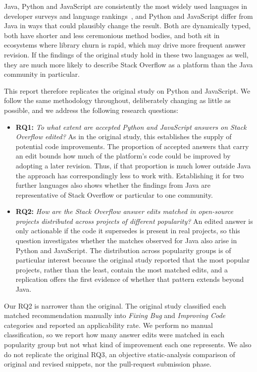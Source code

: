 \documentclass[onecolumn,11pt]{IEEEtran}
\begin{document}
Java, Python and JavaScript are consistently the most widely used languages in developer surveys and language rankings~\cite{cass2024languages}, and Python and JavaScript differ from Java in ways that could plausibly change the result.
Both are dynamically typed, both have shorter and less ceremonious method bodies, and both sit in ecosystems where library churn is rapid, which may drive more frequent answer revision.
If the findings of the original study hold in these two languages as well, they are much more likely to describe Stack Overflow as a platform than the Java community in particular.

This report therefore replicates the original study on Python and JavaScript.
We follow the same methodology throughout, deliberately changing as little as possible, and we address the following research questions:

\begin{itemize}
\item \textbf{RQ1:} \emph{To what extent are accepted Python and JavaScript answers on Stack Overflow edited?}
As in the original study, this establishes the supply of potential code improvements.
The proportion of accepted answers that carry an edit bounds how much of the platform's code could be improved by adopting a later revision. Thus, if that proportion is much lower outside Java the approach has correspondingly less to work with.
Establishing it for two further languages also shows whether the findings from Java are representative of Stack Overflow or particular to one community.
\item \textbf{RQ2:} \emph{How are the Stack Overflow answer edits matched in open-source projects distributed across projects of different popularity?}
An edited answer is only actionable if the code it supersedes is present in real projects, so this question investigates whether the matches observed for Java also arise in Python and JavaScript.
The distribution across popularity groups is of particular interest because the original study reported that the most popular projects, rather than the least, contain the most matched edits, and a replication offers the first evidence of whether that pattern extends beyond Java.
\end{itemize}

Our RQ2 is narrower than the original.
The original study classified each matched recommendation manually into \emph{Fixing Bug} and \emph{Improving Code} categories and reported an applicability rate.
We perform no manual classification, so we report how many answer edits were matched in each popularity group but not what kind of improvement each one represents.
We also do not replicate the original RQ3, an objective static-analysis comparison of original and revised snippets, nor the pull-request submission phase.
\end{document}
